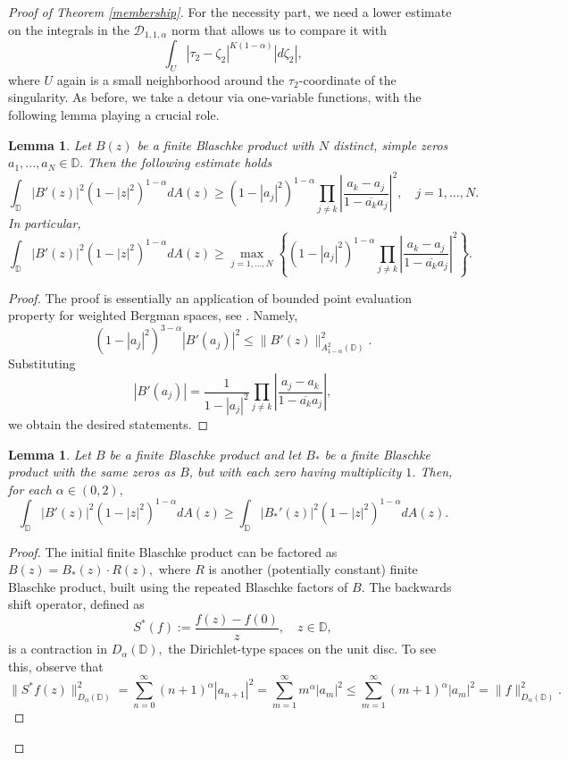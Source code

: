 \documentclass[11pt]{amsart}
\newtheorem{lemma}[theorem]{Lemma}
\numberwithin{equation}{section}
\begin{document}
\begin{proof}[Proof of Theorem \ref{membership}]
For the necessity part, we need a lower estimate on the integrals in the $\mathcal{D}_{1,1,\alpha}$ norm that allows us to compare it with 
$$\int_{U}|\tau_2-\zeta_2|^{K(1-\alpha)}|d\zeta_2|,$$
where $U$ again is a small neighborhood around the $\tau_2$-coordinate of the singularity. As before, we take a detour via one-variable functions, with the following lemma playing a crucial role.
\begin{lemma} Let $B(z)$ be a finite Blaschke product with $N$ distinct, simple zeros $a_1,...,a_N\in\mathbb{D}.$ Then the following estimate holds
$$\int_{\mathbb{D}}|B'(z)|^2(1-|z|^2)^{1-\alpha}dA(z)\ge  (1-|a_j|^2)^{1-\alpha}\prod_{j\neq k}\left|\frac{a_k-a_j}{1-\overline{a_k}a_j}\right|^2, \quad  j=1,\ldots, N.$$
In particular, 
\[\int_{\mathbb{D}}|B'(z)|^2(1-|z|^2)^{1-\alpha}dA(z)\ge
\max_{j=1,\ldots, N}\left\{(1-|a_j|^2)^{1-\alpha}\prod_{j\neq k}\left|\frac{a_k-a_j}{1-\overline{a_k}a_j}\right|^2\right\}.
\label{estimate}
\]
\end{lemma}
\begin{proof} The proof is essentially an application of bounded point evaluation property for weighted Bergman spaces, see \cite[Proposition 1.1]{HedenmalmBook}. Namely, $$(1-|a_j|^2)^{3-\alpha}|B'(a_j)|^2\leq \|B'(z)\|^2_{A^2_{1-\alpha}(\mathbb{D})}.$$
Substituting $$|B'(a_j)|=\frac{1}{1-|a_j|^2}\prod_{j\neq k}\left|\frac{a_j-a_k}{1-\overline{a_k}a_j}\right|,$$ we obtain the desired statements. 
\end{proof}
\begin{lemma} \label{generousReferee} Let $B$ be a finite Blaschke product and let $B_*$ be a finite Blaschke product with the same zeros as $B$, but with each zero having multiplicity $1$. Then, for each $\alpha\in(0,2),$ 
$$\int_{\mathbb{D}}|B'(z)|^2(1-|z|^2)^{1-\alpha}dA(z)\ge \int_{\mathbb{D}}|B_{*}'(z)|^2(1-|z|^2)^{1-\alpha}dA(z).$$
\end{lemma}
\begin{proof}
The initial finite Blaschke product can be factored as $B(z)=B_*(z)\cdot R(z),$ where $R$ is another (potentially constant) finite Blaschke product, built using the repeated Blaschke factors of $B.$ The backwards shift operator, defined as
$$S^*(f):=\frac{f(z)-f(0)}{z}, \quad z\in \mathbb{D},$$
is a contraction in $D_{\alpha}(\mathbb{D}),$ the Dirichlet-type spaces on the unit disc. To see this, observe that
$$\|S^*f(z)\|^2_{D_{\alpha}(\mathbb{D})}=\sum_{n=0}^{\infty}(n+1)^{\alpha}|a_{n+1}|^2=\sum_{m=1}^{\infty}m^{\alpha}|a_m|^2\leq \sum_{m=1}^{\infty}(m+1)^{\alpha}|a_m|^2=\|f\|^2_{D_{\alpha}(\mathbb{D})}.$$

\end{proof}
\end{proof}
\end{document}
